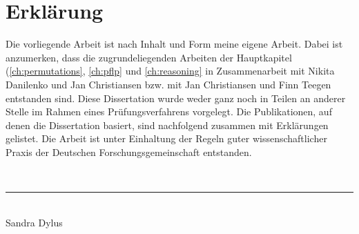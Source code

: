 \chapter*{Erkl\"arung}

Die vorliegende Arbeit ist nach Inhalt und Form meine eigene Arbeit.
Dabei ist anzumerken, dass die zugrundeliegenden Arbeiten der Hauptkapitel (\autoref{ch:permutations}, \autoref{ch:pflp} und \autoref{ch:reasoning} in Zusammenarbeit mit Nikita Danilenko und Jan Christiansen bzw. mit Jan Christiansen und Finn Teegen entstanden sind.
Diese Dissertation wurde weder ganz noch in Teilen an anderer Stelle im Rahmen eines Pr\"ufungsverfahrens vorgelegt.
Die Publikationen, auf denen die Dissertation basiert, sind nachfolgend zusammen mit Erkl\"arungen gelistet.
Die Arbeit ist unter Einhaltung der Regeln guter wissenschaftlicher Praxis der Deutschen Forschungsgemeinschaft entstanden.

\vskip 10mm
\thesisDate \\
\vskip 10mm
\hfill\rule{18em}{.3pt}\\%
\vskip 0.1mm
\hfill Sandra Dylus \quad \quad